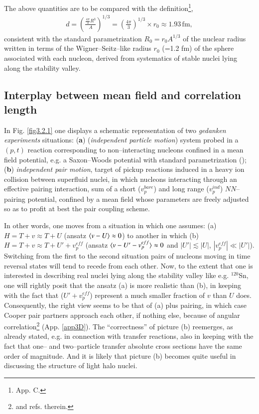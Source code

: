 The above quantities are to be compared with the definition\footnote{\cite{Brink:05} App. C.},
\begin{align}\label{eq3.2.27}
d=\left(\frac{\frac{4\pi}{3}R^3}{A}\right)^{1/3}=\left(\frac{4\pi}{3}\right)^{1/3}\times r_0\approx 1.93\, \text{fm},
\end{align} 
consistent with the standard parametrization $R_0=r_0A^{1/3}$ of the nuclear radius written in terms of the Wigner--Seitz--like radius $r_0$ (=1.2 fm) of the sphere associated with each nucleon, derived from systematics of stable nuclei lying along the stability valley.
\subsection{Interplay between mean field and correlation length}
In Fig. \ref{fig3.2.1} one displays a schematic representation of two \textit{gedanken experiments} situations: (\textbf{a}) (\textit{independent particle motion}) system probed in a $(p,t)$ reaction corresponding to non--interacting nucleons confined in a mean field potential, e.g. a Saxon--Woods potential with standard parametrization (\cite{Bohr:69}); (\textbf{b}) \textit{independent pair motion}, target of pickup reactions induced in a heavy ion collision between superfluid nuclei, in which nucleons interacting through an effective pairing interaction, sum of a short ($v_p^{bare}$) and long range ($v_p^{ind}$) $NN$--pairing potential, confined by a mean field whose parameters are freely adjusted so as to profit at best the pair coupling scheme.


In other words, one moves from a situation in which one assumes: (a)$H=T+v\approx T+U$ (ansatz $\langle {v-U} \rangle\approx 0$) to another in which (b) $H=T+v\approx T+U'+v_p^{eff}$ (ansatz $\langle {v-U'-v_p^{eff}} \rangle\approx 0$ and $|U'|\lesssim|U|$, $|v_p^{eff}|\ll|U'|$). Switching from the first to the second situation pairs of nucleons moving in time reversal states will tend to recede from each other. Now, to the extent that one is interested in describing real nuclei lying along the stability valley like e.g. $^{120}$Sn, one will rightly posit that the ansatz (a) is more realistic  than (b), in keeping with the fact that ($U'+v_p^{eff}$) represent a much smaller fraction of $v$ than $U$ does. Consequently, the right view seems to be that of (a) plus pairing, in which case Cooper pair partners approach each other, if nothing else, because of angular correlation\footnote{\cite{Bertsch:67,Ferreira:84,Matsuo:13} and refs. therein.} (App. \ref{app3D}). The ``correctness'' of picture (b) reemerges, as already stated, e.g. in connection with transfer reactions, also in keeping with the fact that one-- and two--particle transfer  absolute cross sections have the same order of magnitude. And it is likely that picture (b) becomes quite useful  in discussing the structure of light halo nuclei.


